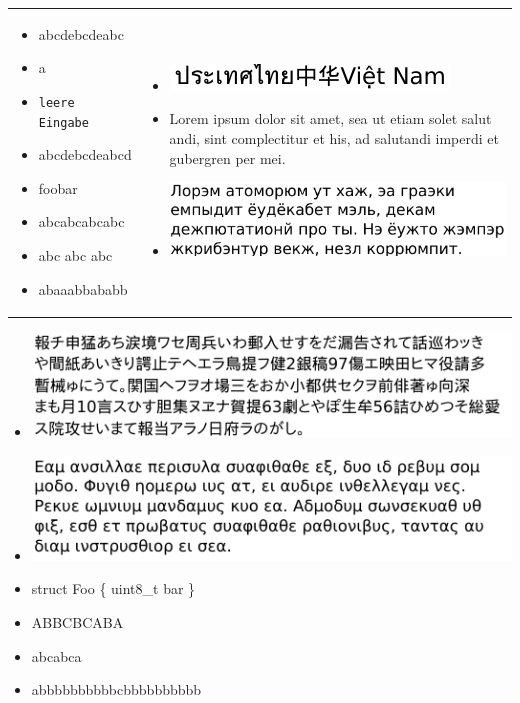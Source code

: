 \documentclass[a4paper,11pt]{scrartcl}%
\theoremstyle{change}
\theoremstyle{nonumberplain}
\theoremstyle{change}
\theoremstyle{nonumberplain}
\theoremstyle{change}
\theoremstyle{nonumberplain}
\begin{document}
\begin{tabular}{p{}p{}}

	\begin{itemize}
		\item abcdebcdeabc
		\item a
		\item \texttt{leere Eingabe}
		\item abcdebcdeabcd
		\item foobar
		\item abcabcabcabc
		\item abc abc  abc
		\item abaaabbababb		
	\end{itemize}&

	\begin{itemize}
		\item \includegraphics{./pics/vietnam}
		\item Lorem ipsum dolor sit amet, sea ut etiam solet salut
		      andi, sint complectitur et his, ad salutandi imperdi
		      et gubergren per mei.
		\item \includegraphics{./pics/russian}
		
	\end{itemize} \\

\end{tabular}



	\begin{itemize}
		\item \includegraphics{./pics/asian}
		\item \includegraphics{./pics/kyril}
		\item struct Foo \{ uint8\_t bar \}
		\item ABBCBCABA
		\item abcabca
		\item abbbbbbbbbbcbbbbbbbbbb		
	\end{itemize}
\end{document}
